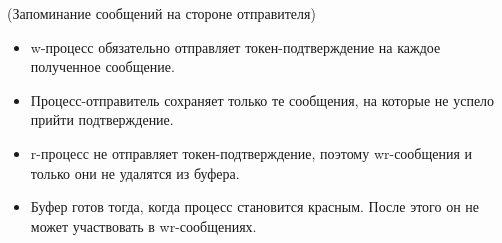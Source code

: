 \begin{algorithm}(Запоминание сообщений на стороне отправителя)
    \enewline
    \begin{itemize}
        \item w-процесс обязательно отправляет токен-подтверждение на каждое
            полученное сообщение.
        \item Процесс-отправитель сохраняет только те сообщения, на которые
            не успело прийти подтверждение.
        \item r-процесс не отправляет токен-подтверждение, поэтому wr-сообщения
            и только они не удалятся из буфера.
        \item Буфер готов тогда, когда процесс становится красным. После этого
            он не может участвовать в wr-сообщениях.
    \end{itemize}
\end{algorithm} 

